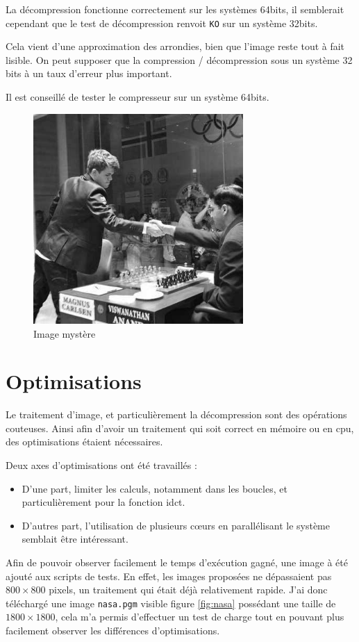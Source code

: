 \documentclass[a4paper, 11pt]{article}
\begin{document}
\begin{attention}
	La décompression fonctionne correctement sur les systèmes 64bits, il semblerait cependant que le test de décompression renvoit \texttt{KO} sur un système
	32bits. 

	Cela vient d'une approximation des arrondies, bien que l'image reste tout à fait lisible. On peut supposer que la compression / décompression sous un système
	32 bits à un taux d'erreur plus important.

	Il est conseillé de tester le compresseur sur un système 64bits.
\end{attention}
	\begin{figure}[H]
		\centering
		\includegraphics[width=8cm]{mystery.jpg}
		\caption{Image mystère}
		\label{fig:mystere}
	\end{figure}

	\section{Optimisations}\label{opti}
	Le traitement d'image, et particulièrement la décompression sont des opérations couteuses. Ainsi afin d'avoir un traitement qui soit correct en mémoire
	ou en cpu, des optimisations étaient nécessaires. 

	Deux axes d'optimisations ont été travaillés : 
	\begin{itemize}
		\item D'une part, limiter les calculs, notamment dans les boucles, et particulièrement pour la fonction idct. 
		\item D'autres part, l'utilisation de plusieurs cœurs en parallélisant le système semblait être intéressant.
	\end{itemize}
	
	Afin de pouvoir observer facilement le temps d'exécution gagné, une image à été ajouté aux scripts de tests. En effet, les images proposées ne dépassaient
	pas $800\times800$ pixels, un traitement qui était déjà relativement rapide. J'ai donc téléchargé une image \texttt{nasa.pgm} visible figure \ref{fig:nasa} possédant une taille de
	$1800\times1800$, cela m'a permis d'effectuer un test de charge tout en pouvant plus facilement observer les différences d'optimisations.
\end{document}
